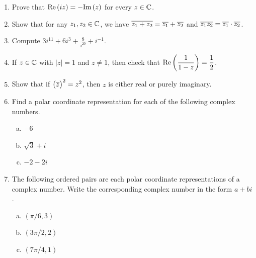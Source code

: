 \documentclass[11pt,fleqn,dvipsnames,usenames]{article}
\begin{document}
\begin{enumerate}
\item Prove that $\text{Re}\left(iz\right) = -\text{Im}\left(z\right)$ for every $z\in\mathbb{C}$.
\item Show that for any $z_{1},z_{2}\in\mathbb{C}$, we have $\overline{z_{1} + z_{2}} = \overline{z_{1}} + \overline{z_{2}}$ and $\overline{z_{1}z_{2}} = \overline{z_{1}}\cdot \overline{z_{2}}$.
\item Compute $3i^{11} + 6i^{3} + \frac{8}{i^{20}} + i^{-1}$.
\item If $z\in\mathbb{C}$ with $|z| = 1$ and $z\neq 1$, then check that $\text{Re}\left(\dfrac{1}{1-z}\right) = \dfrac{1}{2}$.
\item Show that if $\big(\overline{z}\big)^2 = z^2$, then $z$ is either real or purely imaginary.
\item Find a polar coordinate representation for each of the following complex numbers.
\begin{multicols}{3}
\begin{enumerate}[(a)]
\item $-6$
\item $\sqrt{3} + i$
\item $-2-2i$
\end{enumerate}
\end{multicols}
\item The following ordered pairs are each polar coordinate representations of a complex number.  Write the corresponding complex number in the form $a + bi$.
\begin{multicols}{3}
\begin{enumerate}[(a)]
\item $(\pi/6,3)$
\item $(3\pi/2,2)$
\item $(7\pi/4,1)$
\end{enumerate}

\end{multicols}
\end{enumerate}
\end{document}
